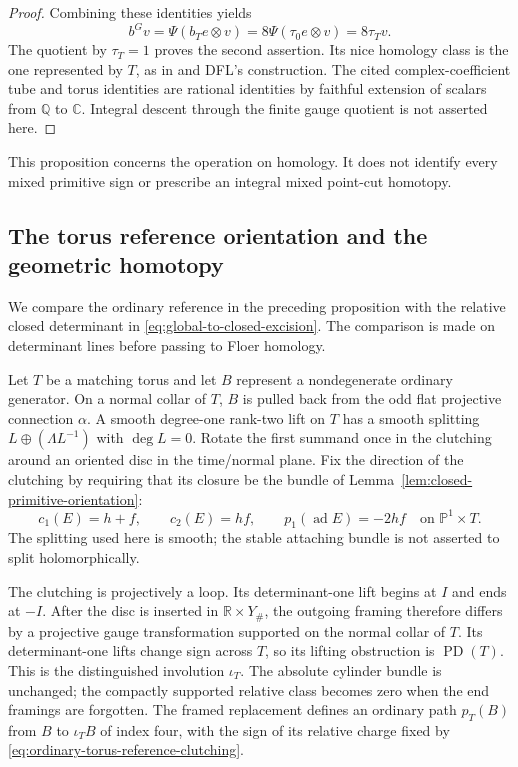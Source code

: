 \documentclass[11pt]{amsart}
\theoremstyle{definition}
\theoremstyle{remark}
\theoremstyle{plain}
\newcommand{\PP}{\mathbb{P}}
\begin{document}
\begin{proof}
Combining these identities yields
\[
 b^Gv=\Psi(b_Te\otimes v)
      =8\Psi(\tau_0e\otimes v)=8\tau_Tv.
\]
The quotient by $\tau_T=1$ proves the second
assertion. Its nice homology class is the one
represented by $T$, as in
\cite[Section~7.1]{KronheimerMrowka10}
and DFL's construction.
The cited complex-coefficient tube and torus
identities are rational identities by faithful
extension of scalars from $\mathbb Q$ to
$\mathbb C$. Integral descent through the
finite gauge quotient is not asserted here.
\end{proof}

This proposition concerns the operation on homology.
It does not identify every mixed primitive sign
or prescribe an integral mixed point-cut homotopy.

\subsection{The torus reference orientation and the geometric homotopy}
\label{sec:torus-reference-orientation}

We compare the ordinary reference in the preceding proposition
with the relative closed determinant in
\eqref{eq:global-to-closed-excision}. The comparison is made
on determinant lines before passing to Floer homology.

Let $T$ be a matching torus and let $B$ represent a
nondegenerate ordinary generator. On a normal collar of $T$,
$B$ is pulled back from the odd flat projective connection
$\alpha$. A smooth degree-one rank-two lift on $T$ has a
smooth splitting $L\oplus(\Lambda L^{-1})$ with $\deg L=0$.
Rotate the first summand once in the clutching around an
oriented disc in the time/normal plane. Fix the direction
of the clutching by requiring that its closure be the
bundle of Lemma~\ref{lem:closed-primitive-orientation}:
\begin{equation}\label{eq:ordinary-torus-reference-clutching}
 c_1(E)=h+f,\qquad c_2(E)=hf,\qquad
 p_1(\operatorname{ad}E)=-2hf
       \quad\text{on }\PP^1\times T.
\end{equation}
The splitting used here is smooth; the stable attaching
bundle is not asserted to split holomorphically.

The clutching is projectively a loop. Its determinant-one
lift begins at $I$ and ends at $-I$. After the disc is
inserted in $\mathbb R\times Y_\#$, the outgoing framing
therefore differs by a projective gauge transformation
supported on the normal collar of $T$. Its determinant-one
lifts change sign across $T$, so its lifting obstruction
is $\operatorname{PD}(T)$. This is the distinguished
involution $\iota_T$. The absolute cylinder bundle is
unchanged; the compactly supported relative class becomes
zero when the end framings are forgotten. The framed
replacement defines an ordinary path $p_T(B)$ from $B$
to $\iota_T B$ of index four, with the sign of its
relative charge fixed by
\eqref{eq:ordinary-torus-reference-clutching}.
\end{document}
